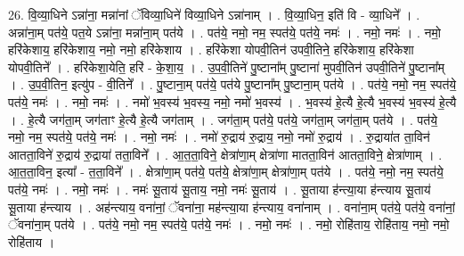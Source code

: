 \documentclass[17pt]{extarticle}
\begin{document}
26. वि॒व्या॒धिने ऽन्ना॑ना॒ मन्ना॑नां ॅविव्या॒धिने॑ विव्या॒धिने ऽन्ना॑नाम् । . वि॒व्या॒धिन॒ इति॑ वि - व्या॒धिने᳚ । . अन्ना॑ना॒म् पत॑ये॒ पत॒ये ऽन्ना॑ना॒ मन्ना॑ना॒म् पत॑ये । . पत॑ये॒ नमो॒ नम॒ स्पत॑ये॒ पत॑ये॒ नमः॑ । . नमो॒ नमः॑ । . नमो॒ हरि॑केशाय॒ हरि॑केशाय॒ नमो॒ नमो॒ हरि॑केशाय । . हरि॑केशा योपवी॒तिन॑ उपवी॒तिने॒ हरि॑केशाय॒ हरि॑केशा योपवी॒तिने᳚ । . हरि॑केशा॒येति॒ हरि॑ - के॒शा॒य॒ । . उ॒प॒वी॒तिने॑ पु॒ष्टाना᳚म् पु॒ष्टाना॑ मुपवी॒तिन॑ उपवी॒तिने॑ पु॒ष्टाना᳚म् । . उ॒प॒वी॒तिन॒ इत्यु॑प - वी॒तिने᳚ । . पु॒ष्टाना॒म् पत॑ये॒ पत॑ये पु॒ष्टाना᳚म् पु॒ष्टाना॒म् पत॑ये । . पत॑ये॒ नमो॒ नम॒ स्पत॑ये॒ पत॑ये॒ नमः॑ । . नमो॒ नमः॑ । . नमो॑ भ॒वस्य॑ भ॒वस्य॒ नमो॒ नमो॑ भ॒वस्य॑ । . भ॒वस्य॑ हे॒त्यै हे॒त्यै भ॒वस्य॑ भ॒वस्य॑ हे॒त्यै । . हे॒त्यै जग॑ता॒म् जग॑ताꣳ हे॒त्यै हे॒त्यै जग॑ताम् । . जग॑ता॒म् पत॑ये॒ पत॑ये॒ जग॑ता॒म् जग॑ता॒म् पत॑ये । . पत॑ये॒ नमो॒ नम॒ स्पत॑ये॒ पत॑ये॒ नमः॑ । . नमो॒ नमः॑ । . नमो॑ रु॒द्राय॑ रु॒द्राय॒ नमो॒ नमो॑ रु॒द्राय॑ । . रु॒द्राया॑त ता॒विन॑ आतता॒विने॑ रु॒द्राय॑ रु॒द्राया॑ तता॒विने᳚ । . आ॒त॒ता॒विने॒ क्षेत्रा॑णा॒म् क्षेत्रा॑णा मातता॒विन॑ आतता॒विने॒ क्षेत्रा॑णाम् । . आ॒त॒ता॒विन॒ इत्या᳚ - त॒ता॒विने᳚ । . क्षेत्रा॑णा॒म् पत॑ये॒ पत॑ये॒ क्षेत्रा॑णा॒म् क्षेत्रा॑णा॒म् पत॑ये । . पत॑ये॒ नमो॒ नम॒ स्पत॑ये॒ पत॑ये॒ नमः॑ । . नमो॒ नमः॑ । . नमः॑ सू॒ताय॑ सू॒ताय॒ नमो॒ नमः॑ सू॒ताय॑ । . सू॒ताया ह॑न्त्या॒या ह॑न्त्याय सू॒ताय॑ सू॒ताया ह॑न्त्याय । . अह॑न्त्याय॒ वना॑नां॒ ॅवना॑ना॒ मह॑न्त्या॒या ह॑न्त्याय॒ वना॑नाम् । . वना॑ना॒म् पत॑ये॒ पत॑ये॒ वना॑नां॒ ॅवना॑ना॒म् पत॑ये । . पत॑ये॒ नमो॒ नम॒ स्पत॑ये॒ पत॑ये॒ नमः॑ । . नमो॒ नमः॑ । . नमो॒ रोहि॑ताय॒ रोहि॑ताय॒ नमो॒ नमो॒ रोहि॑ताय । \newline
\end{document}
